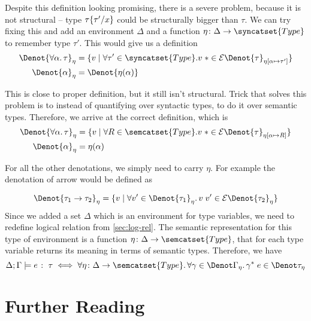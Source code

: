 Despite this definition looking promising, there is a severe problem,
because it is not structural -- type $\tau\{\tau'/x\}$ could be structurally
bigger than $\tau$. We can try fixing this and add an environment $\Delta$ and
a function $\eta\colon\Delta\to\syncatset{Type}$ to remember type $\tau'$.
This would give us a definition
\begin{alignat*}{2}
  \Denot{\forall\alpha\ldotp\tau}_{\eta} & = \{ v \mid
    \forall \tau' \in \syncatset{Type}.
      v\;* \in \mathcal{E}\Denot{\tau}_{\eta[\alpha \mapsto \tau']} \} \\
  \Denot{\alpha}_{\eta} & = \Denot{\eta(\alpha)}
\end{alignat*}

This is close to proper definition, but it still isn't structural.
Trick that solves this problem is to instead of quantifying over
syntactic types, to do it over semantic types.
Therefore, we arrive at the correct definition, which is
\begin{alignat*}{2}
  \Denot{\forall\alpha\ldotp\tau}_{\eta} & = \{ v \mid
    \forall R \in \semcatset{Type}.
      v\;* \in \mathcal{E}\Denot{\tau}_{\eta[\alpha \mapsto R]} \} \\
  \Denot{\alpha}_{\eta} & = \eta(\alpha)
\end{alignat*}

For all the other denotations, we simply need to carry $\eta$.
For example the denotation of arrow would be defined as

\[
  \Denot{\tau_1 \to \tau_2}_\eta = \{ v \mid
    \forall v' \in \Denot{\tau_1}_\eta\ldotp
      v\;v' \in \mathcal{E}\Denot{\tau_2}_\eta \} \\\\
\]
Since we added a set $\Delta$ which is an environment for type variables,
we need to redefine logical relation from \autoref{sec:log-rel}.
The semantic representation for this type of environment is a function
$\eta\colon\Delta\to\semcatset{Type}$, that for each type variable returns
its meaning in terms of semantic types. Therefore, we have
\[
  \Delta; \Gamma\models e \;\colon\; \tau \iff
    \forall \eta\colon\Delta\to\semcatset{Type}\ldotp
      \forall \gamma\in\Denot\Gamma_\eta\ldotp
        \gamma^*\;e \in\Denot\tau_\eta
\]

\section{Further Reading}
